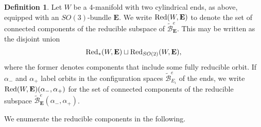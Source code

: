 \documentclass{memo-l}
\theoremstyle{definition}
\newtheorem{definition}[theorem]{Definition}
\theoremstyle{remark}
\numberwithin{section}{chapter}
\numberwithin{equation}{chapter}
\begin{document}
\begin{definition}\label{red-def-W}Let $W$ be a 4-manifold with two cylindrical ends, as above, equipped with an $SO(3)$-bundle $\mathbf{E}$. We write $\textup{Red}(W,\mathbf{E})$ to denote the set of connected components of the reducible subspace of $\widetilde{\mathcal B}^e_{\mathbf{E}}$. This may be written as the disjoint union $$\textup{Red}_*(W,\mathbf{E}) \sqcup \textup{Red}_{SO(2)}(W,\mathbf{E}),$$ where the former denotes components that include some fully reducible orbit. If $\alpha_-$ and $\alpha_+$ label orbits in the configuration spaces $\widetilde{\mathcal B}^e_{E_i}$ of the ends, we write $\textup{Red}(W,\mathbf{E})(\alpha_-, \alpha_+)$ for the set of connected components of the reducible subspace $\widetilde{\mathcal B}^{e}_{\mathbf{E}}(\alpha_-, \alpha_+)$.
\end{definition}

We enumerate the reducible components in the following.
\end{document}
